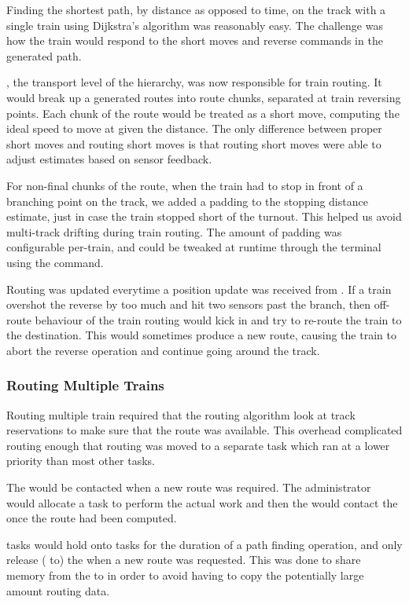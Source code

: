 \documentclass[pdftex,10pt,a4paper]{article}
\begin{document}
Finding the shortest path, by distance as opposed to time, on the
track with a single train using Dijkstra's algorithm was reasonably
easy. The challenge was how the train would respond to the short moves
and reverse commands in the generated path.

, the transport level of the hierarchy, was now
responsible for train routing. It would break up a generated routes
into route chunks, separated at train reversing points. Each chunk of
the route would be treated as a short move, computing the ideal speed
to move at given the distance. The only difference between proper
short moves and routing short moves is that routing short moves were
able to adjust estimates based on sensor feedback.

For non-final chunks of the route, when the train had to stop in front
of a branching point on the track, we added a padding to the stopping
distance estimate, just in case the train stopped short of the
turnout. This helped us avoid multi-track drifting during train
routing. The amount of padding was configurable per-train, and could
be tweaked at runtime through the terminal using the  command.

Routing was updated everytime a position update was received from
. If a train overshot the reverse by too much and hit two
sensors past the branch, then off-route behaviour of the train routing
would kick in and try to re-route the train to the destination. This
would sometimes produce a new route, causing the train to abort the
reverse operation and continue going around the track.

\subsubsection*{Routing Multiple Trains}

Routing multiple train required that the routing algorithm look at
track reservations to make sure that the route was available. This
overhead complicated routing enough that routing was moved to a
separate task which ran at a lower priority than most other tasks.

The  would be contacted when a new
route was required. The administrator would allocate a 
task to perform the actual work and then the  would
contact the  once the route had been computed.

 tasks would hold onto  tasks for the duration
of a path finding operation, and only release ( to) the
 when a new route was requested. This was done to share
memory from the  to  in order to avoid
having to copy the potentially large amount routing data.
\end{document}
